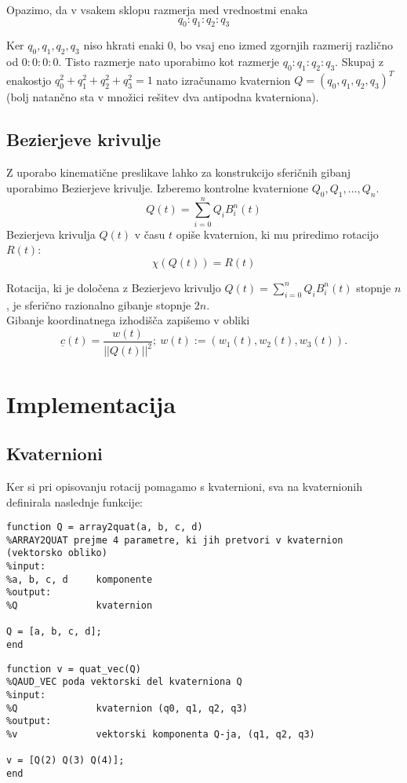 \documentclass[12pt,a4paper,twoside]{article}
\theoremstyle{definition} %
\theoremstyle{plain} %
\numberwithin{equation}{section}  %
\begin{document}
\noindent Opazimo, da v vsakem sklopu razmerja med vrednostmi enaka
$$ q_0 : q_1 : q_2 : q_3 $$

\noindent Ker $q_0,q_1,q_2,q_3$ niso hkrati enaki $0$, bo vsaj eno izmed zgornjih razmerij različno od $0 : 0 : 0 : 0$. Tisto razmerje nato uporabimo kot razmerje $ q_0 : q_1 : q_2 : q_3 $. Skupaj z enakostjo $q_0^2 + q_1^2 + q_2^2 + q_3^2 = 1$ nato izračunamo kvaternion $Q=(q_0,q_1,q_2,q_3)^T$ (bolj natančno sta v množici rešitev dva antipodna kvaterniona).
\subsection{Bezierjeve krivulje}
\noindent Z uporabo kinematične preslikave lahko za konstrukcijo sferičnih gibanj uporabimo Bezierjeve krivulje. Izberemo kontrolne kvaternione $Q_0,Q_1,\dots,Q_n$.
$$Q(t) = \sum\limits_{i=0}^{n} Q_i B_i^n(t)$$
\noindent Bezierjeva krivulja $Q(t)$ v času $t$ opiše kvaternion, ki mu priredimo rotacijo $R(t)$:
$$\chi(Q(t)) = R(t)$$

\noindent Rotacija, ki je določena z Bezierjevo krivuljo $Q(t) = \sum\limits_{i=0}^{n} Q_i B_i^n(t)$ stopnje $n$, je sferično razionalno gibanje stopnje $2n$. \\

\noindent Gibanje koordinatnega izhodišča zapišemo v obliki
$$\underline{c}(t) = \frac{w(t)}{||Q(t)||^2};~ w(t) := (w_1(t), w_2(t),w_3(t)).$$

\noindent 


\newpage

\section{Implementacija}

\subsection{Kvaternioni}
Ker si pri opisovanju rotacij pomagamo s kvaternioni, sva na kvaternionih definirala naslednje funkcije:

\begin{lstlisting}[caption = {array2quat}]
function Q = array2quat(a, b, c, d)
%ARRAY2QUAT prejme 4 parametre, ki jih pretvori v kvaternion (vektorsko obliko)
%input:
%a, b, c, d     komponente   
%output:
%Q              kvaternion

Q = [a, b, c, d];
end
\end{lstlisting}

\begin{lstlisting}[caption = {quat\_vec}]
function v = quat_vec(Q)
%QAUD_VEC poda vektorski del kvaterniona Q
%input:
%Q              kvaternion (q0, q1, q2, q3)
%output:
%v              vektorski komponenta Q-ja, (q1, q2, q3)

v = [Q(2) Q(3) Q(4)];
end
\end{lstlisting}
\end{document}
